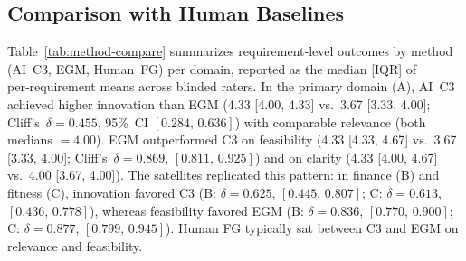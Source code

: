 \documentclass[acmsmall]{acmart}
\begin{document}
\subsection{Comparison with Human Baselines}
Table~\ref{tab:method-compare} summarizes requirement‐level outcomes by method (AI~C3, EGM, Human~FG) per domain, reported as the median [IQR] of per‑requirement means across blinded raters. In the primary domain (A), AI~C3 achieved higher innovation than EGM (4.33 [4.00, 4.33] vs.\ 3.67 [3.33, 4.00]; Cliff’s~$\delta{=}0.455$, 95\%~CI $[0.284,\,0.636]$) with comparable relevance (both medians $=4.00$). EGM outperformed C3 on feasibility (4.33 [4.33, 4.67] vs.\ 3.67 [3.33, 4.00]; Cliff’s~$\delta{=}0.869$, $[0.811,\,0.925]$) and on clarity (4.33 [4.00, 4.67] vs.\ 4.00 [3.67, 4.00]). The satellites replicated this pattern: in finance (B) and fitness (C), innovation favored C3 (B: $\delta{=}0.625$, $[0.445,\,0.807]$; C: $\delta{=}0.613$, $[0.436,\,0.778]$), whereas feasibility favored EGM (B: $\delta{=}0.836$, $[0.770,\,0.900]$; C: $\delta{=}0.877$, $[0.799,\,0.945]$). Human FG typically sat between C3 and EGM on relevance and feasibility. 
\end{document}
